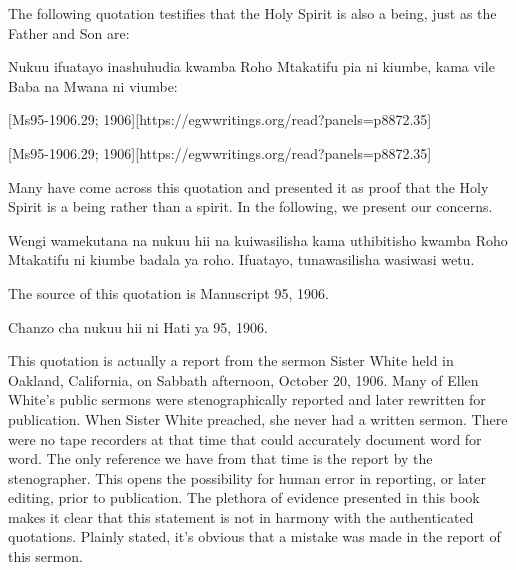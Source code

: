 The following quotation testifies that the Holy Spirit is also a being, just as the Father and Son are:


Nukuu ifuatayo inashuhudia kwamba Roho Mtakatifu pia ni kiumbe, kama vile Baba na Mwana ni viumbe:


[Ms95-1906.29; 1906][https://egwwritings.org/read?panels=p8872.35]


[Ms95-1906.29; 1906][https://egwwritings.org/read?panels=p8872.35]


Many have come across this quotation and presented it as proof that the Holy Spirit is a being rather than a spirit. In the following, we present our concerns.


Wengi wamekutana na nukuu hii na kuiwasilisha kama uthibitisho kwamba Roho Mtakatifu ni kiumbe badala ya roho. Ifuatayo, tunawasilisha wasiwasi wetu.


The source of this quotation is Manuscript 95, 1906.


Chanzo cha nukuu hii ni Hati ya 95, 1906.


This quotation is actually a report from the sermon Sister White held in Oakland, California, on Sabbath afternoon, October 20, 1906. Many of Ellen White’s public sermons were stenographically reported and later rewritten for publication. When Sister White preached, she never had a written sermon. There were no tape recorders at that time that could accurately document word for word. The only reference we have from that time is the report by the stenographer. This opens the possibility for human error in reporting, or later editing, prior to publication. The plethora of evidence presented in this book makes it clear that this statement is not in harmony with the authenticated quotations. Plainly stated, it’s obvious that a mistake was made in the report of this sermon.


